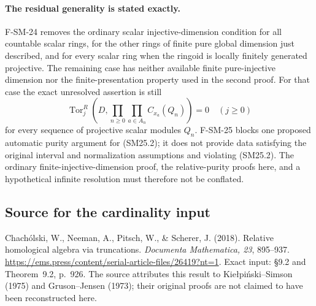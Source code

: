 \paragraph{The residual generality is stated exactly.}
F-SM-24 removes the ordinary scalar injective-dimension condition
for all countable scalar rings, for the other rings of finite
pure global dimension just described, and for every scalar ring
when the ringoid is locally finitely generated projective.
The remaining case has neither available finite pure-injective
dimension nor the finite-presentation property used in the second
proof. For that case the exact unresolved assertion is still
\[
 \operatorname{Tor}_j^R
 \left(D,\prod_{n\geq0}\prod_{a\in A_n}C_{x_a}(Q_n)\right)=0
 \quad(j\geq0)
 \tag{SM25.2}
\]
for every sequence of projective scalar modules $Q_n$.
F-SM-25 blocks one proposed automatic purity argument for
(SM25.2); it does not provide data satisfying the original
interval and normalization assumptions and violating (SM25.2).
The ordinary finite-injective-dimension proof, the relative-purity
proofs here, and a hypothetical infinite resolution must therefore
not be conflated.

\subsection*{Source for the cardinality input}
Chach\'olski, W., Neeman, A., Pitsch, W., \& Scherer, J. (2018).
Relative homological algebra via truncations.
\emph{Documenta Mathematica, 23}, 895--937.
\url{https://ems.press/content/serial-article-files/26419?nt=1}.
Exact input: \S9.2 and Theorem~9.2, p.~926.
The source attributes this result to
Kie{\l}pi\'nski--Simson (1975) and Gruson--Jensen (1973);
their original proofs are not claimed to have been reconstructed here.

